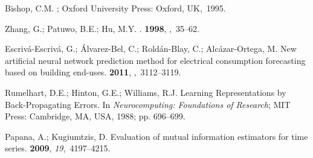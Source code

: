 \documentclass[energies,article,accept,moreauthors,pdftex,12pt,a4paper]{mdpi}
\begin{document}
\begin{thebibliography}{----}
Bishop, C.M.
; Oxford University
 Press: Oxford, UK,~1995.

Zhang, G.; Patuwo, B.E.; Hu, M.Y.
.
 {\bf 1998},
,~35--62.

Escriv\'a-Escriv\'a, G.; \'Alvarez-Bel, C.; Rold\'an-Blay, C.;
 Alc\'azar-Ortega, M.
\newblock New artificial neural network prediction method for electrical
 consumption forecasting based on building end-uses.
 {\bf 2011},
,~3112--3119.

Rumelhart, D.E.; Hinton, G.E.; Williams, R.J.
\newblock Learning Representations by Back-Propagating Errors. In {\it Neurocomputing: Foundations of Research};  MIT Press: Cambridge, MA, USA, 1988;
\newblock pp.  696--699.

Papana, A.; Kugiumtzis, D.
\newblock Evaluation of mutual information estimators for time series.
\newblock
{} {\bf 2009}, {\it 19},~4197--4215.

\end{thebibliography}
\end{document}
